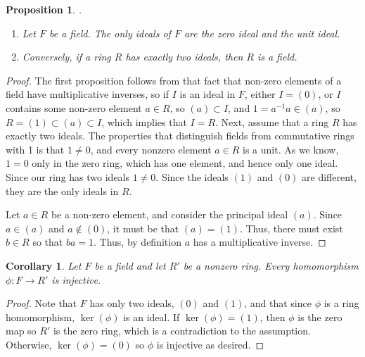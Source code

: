 \documentclass[12pt]{article}
\newtheorem{cor}[thm]{Corollary}
\newtheorem{prop}[thm]{Proposition}
\theoremstyle{definition}
\theoremstyle{remark}
\numberwithin{equation}{section}
\begin{document}
\vspace{15pt}

\begin{prop}
        .\newline\begin{enumerate}
                \item Let $F$ be a field. The only ideals of $F$ are the zero ideal and the unit ideal.
                \item Conversely, if a ring $R$ has exactly two ideals, then $R$ is a field.
        \end{enumerate}
\end{prop}
\begin{proof}
        The first proposition follows from that fact that non-zero elements of a field have multiplicative inverses, so if $I$ is an ideal in $F$, either $I = (0)$, or $I$ contains some non-zero element $a \in R$, so $(a) \subset I$, and $1 = a^{-1}a \in (a)$, so $R = (1) \subset (a) \subset I$, which implies that $I = R$. Next, assume that a ring $R$ has exactly two ideals. The properties that distinguish fields from commutative rings with 1 is that $1 \neq 0$, and every nonzero element $a \in R$ is a unit. As we know, $1=0$ only in the zero ring, which has one element, and hence only one ideal. Since our ring has two ideals $1 \neq 0$. Since the ideals $(1)$ and $(0)$ are different, they are the only ideals in $R$.

        Let $a \in R$ be a non-zero element, and consider the principal ideal $(a)$. Since $a \in (a)$ and $a \notin (0)$, it must be that $(a) = (1)$. Thus, there must exist $b \in R$ so that $ba = 1$. Thus, by definition $a$ has a multiplicative inverse.
\end{proof}

\vspace{15pt}


\begin{cor}
        Let $F$ be a field and let $R'$ be a nonzero ring. Every homomorphism $\phi:F \rightarrow R'$ is injective.
\end{cor}
\begin{proof}
        Note that $F$ has only two ideals, $(0)$ and $(1)$, and that since $\phi$ is a ring homomorphism, $\ker(\phi)$ is an ideal. If $\ker(\phi) = (1)$, then $\phi$ is the zero map so $R'$ is the zero ring, which is a contradiction to the assumption. Otherwise, $\ker(\phi) = (0)$ so $\phi$ is injective as desired.
\end{proof}
\end{document}
